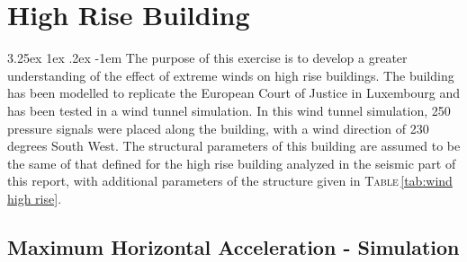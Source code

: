 \documentclass[11pt,a4paper,titlepage]{report}
\makeatletter
\renewcommand\paragraph{\@startsection{paragraph}{5}{\z@}%
  {3.25ex \@plus1ex \@minus.2ex}%
  {-1em}%
  {\normalfont\normalsize\bfseries}}
\makeatother
\begin{document}
\chapter{High Rise Building}
\paragraph{}The purpose of this exercise is to develop  a greater understanding of the effect of extreme winds on high rise buildings. The building has been modelled to replicate the European Court of Justice in Luxembourg and has been tested in a wind tunnel simulation. In this wind tunnel simulation, 250 pressure signals were placed along the building, with a wind direction of 230 degrees South West. The structural parameters of this building are assumed to be the same of that defined for the high rise building analyzed in the seismic part of this report, with additional parameters of the structure given in \textsc{Table}\,\ref{tab:wind high rise}. 
\section{Maximum Horizontal Acceleration - Simulation}
\end{document}
